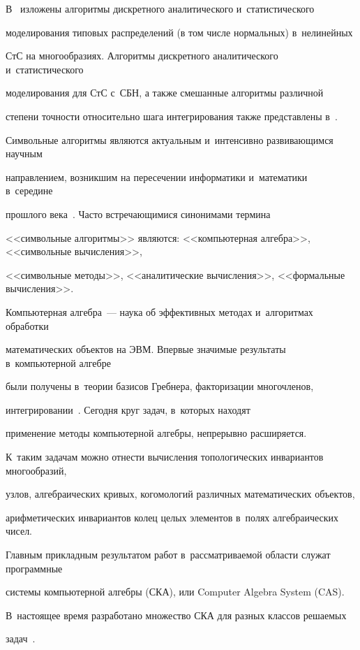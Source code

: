 В~\cite{9-sin} изложены алгоритмы дискретного аналитического и~статистического

моделирования типовых распределений (в том числе нормальных) в~нелинейных

СтС на многообразиях. Алгоритмы дискретного аналитического и~статистического

моделирования для СтС с~СБН, а также смешанные алгоритмы различной

степени точности относительно шага интегрирования также представлены в~\cite{9-sin}.



Символьные алгоритмы являются актуальным и~интенсивно развивающимся научным 

направлением, возникшим на пересечении информатики и~математики в~середине 

прошлого века~\cite{12-sin, 13-sin}. Часто встречающимися синонимами термина 

<<символьные алгоритмы>> являются: <<компьютерная алгебра>>, <<символьные вычисления>>, 

<<символьные методы>>, <<аналитические вычисления>>, <<формальные вычисления>>. 

Компьютерная алгебра~---  наука об эффективных методах и~алгоритмах обработки 

математических объектов на ЭВМ. Впервые значимые результаты в~компьютерной алгебре 

были получены в~теории базисов Гребнера, факторизации многочленов, 

интегрировании~\cite{13-sin, 14-sin}. Сегодня круг задач, в~которых находят 

применение методы компьютерной алгебры, непрерывно расширяется. 

К~таким задачам можно отнести вычисления топологических инвариантов многообразий, 

узлов, алгебраических кривых, когомологий различных математических объектов, 

арифметических инвариантов колец целых элементов в~полях алгебраических чисел.



Главным прикладным результатом работ в~рассматриваемой области служат программные 

системы компьютерной алгебры (СКА), или Computer Algebra System (CAS). 

В~настоящее время разработано множество СКА для разных классов решаемых 

задач~\cite{15-sin}. 

